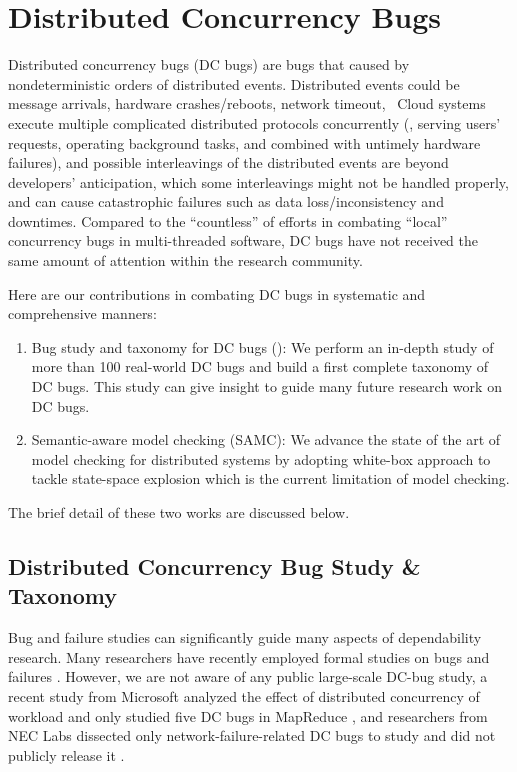\section{Distributed Concurrency Bugs}

Distributed concurrency bugs (DC bugs) are bugs that caused by nondeterministic
orders of distributed events. Distributed events could be message arrivals,
hardware crashes/reboots, network timeout, \etc\ Cloud systems execute multiple
complicated distributed protocols concurrently (\eg, serving users' requests,
operating background tasks, and combined with untimely hardware failures), and
possible interleavings of the distributed events are beyond developers'
anticipation, which some interleavings might not be handled properly, and can
cause catastrophic failures such as data loss/inconsistency and downtimes.
Compared to the ``countless'' of efforts in combating ``local'' concurrency bugs
in multi-threaded software, DC bugs have not received the same amount of
attention within the research community.

Here are our contributions in combating DC bugs in systematic and comprehensive manners:

\begin{enumerate}

\item Bug study and taxonomy for DC bugs (\taxdc): We perform an in-depth study
of more than 100 real-world DC bugs and build a first complete taxonomy of DC
bugs. This study can give insight to guide many future research work on DC
bugs.

\item Semantic-aware model checking (SAMC): We advance the state of the art of
model checking for distributed systems by adopting white-box approach to tackle
state-space explosion which is the current limitation of model checking.

\end{enumerate}

The brief detail of these two works are discussed below.

\subsection{Distributed Concurrency Bug Study \& Taxonomy}

Bug and failure studies can significantly guide many aspects of dependability
research. Many researchers have recently employed formal studies on bugs and
failures \cite{Jin+12-PerformanceBugs, Li+13-ScopeBugStudy, Li+07-MemoryErrors,
Lu+08-ConcurrencyBugStudy, Sahoo+10-StudyBugsServerSoftware,
SridharanLiberty12-StudyDRAMFailures, Xiao+14-NonDetMR,
Yin+11-StudyConfErrors}.
%
However, we are not aware of any public large-scale DC-bug study, a recent study
from Microsoft analyzed the effect of distributed concurrency of workload and
only studied five DC bugs in MapReduce \cite{Xiao+14-NonDetMR}, and researchers
from NEC Labs dissected only network-failure-related DC bugs to study and did
not publicly release it \cite{Joshi+13-SetsudoTesting}.

